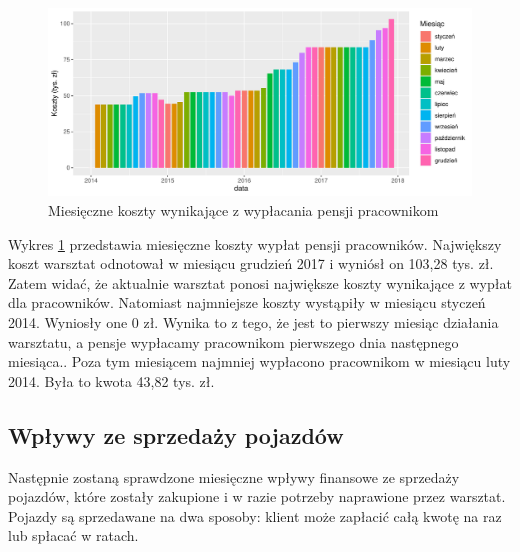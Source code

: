 \documentclass{article}\usepackage[]{graphicx}\usepackage[]{xcolor}
\makeatletter
\def\maxwidth{ %
  \ifdim\Gin@nat@width>\linewidth
    \linewidth
  \else
    \Gin@nat@width
  \fi
}
\newenvironment{knitrout}{}{} %
\makeatother
\begin{document}
\begin{knitrout}
\color{fgcolor}\begin{figure}[H]

{\centering \includegraphics[width=\maxwidth]{figure/fig_pracownicy-1} 

}

\caption[Miesięczne koszty wynikające z wypłacania pensji pracownikom]{Miesięczne koszty wynikające z wypłacania pensji pracownikom}\label{fig:fig_pracownicy}
\end{figure}

\end{knitrout}

Wykres \ref{fig:fig_pracownicy} przedstawia miesięczne koszty wypłat pensji pracowników. Największy koszt warsztat odnotował w miesiącu grudzień 2017 i wyniósł on 103,28 tys. zł. Zatem widać, że aktualnie warsztat ponosi największe koszty wynikające z wypłat dla pracowników. 
Natomiast najmniejsze koszty wystąpiły w miesiącu styczeń 2014. Wyniosły one 0 zł. Wynika to z tego, że jest to pierwszy miesiąc działania warsztatu, a pensje wypłacamy pracownikom pierwszego dnia następnego miesiąca.. Poza tym miesiącem najmniej wypłacono pracownikom w miesiącu luty 2014. Była to kwota 43,82 tys. zł.

\subsection{Wpływy ze sprzedaży pojazdów}

Następnie zostaną sprawdzone miesięczne wpływy finansowe ze sprzedaży pojazdów, które zostały zakupione i w razie potrzeby naprawione przez warsztat. Pojazdy są sprzedawane na dwa sposoby: klient może zapłacić całą kwotę na raz lub spłacać w ratach.
\end{document}
